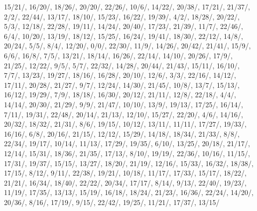 15/21/{}, 16/20/{}, 18/26/{}, 20/20/{}, 22/26/{}, 10/6/{}, 14/22/{}, 20/38/{}, 17/21/{}, 21/37/{}, 2/2/{}, 22/44/{}, 13/17/{}, 18/10/{}, 15/23/{}, 16/22/{}, 19/39/{}, 4/2/{}, 18/28/{}, 20/22/{}, 5/3/{}, 12/18/{}, 22/28/{}, 19/11/{}, 14/24/{}, 20/40/{}, 17/23/{}, 21/39/{}, 11/7/{}, 22/46/{}, 6/4/{}, 10/20/{}, 13/19/{}, 18/12/{}, 15/25/{}, 16/24/{}, 19/41/{}, 18/30/{}, 22/12/{}, 14/8/{}, 20/24/{}, 5/5/{}, 8/4/{}, 12/20/{}, 0/0/{}, 22/30/{}, 11/9/{}, 14/26/{}, 20/42/{}, 21/41/{}, 15/9/{}, 6/6/{}, 16/8/{}, 7/5/{}, 13/21/{}, 18/14/{}, 16/26/{}, 22/14/{}, 14/10/{}, 20/26/{}, 17/9/{}, 21/25/{}, 12/22/{}, 9/5/{}, 5/7/{}, 22/32/{}, 14/28/{}, 20/44/{}, 21/43/{}, 15/11/{}, 16/10/{}, 7/7/{}, 13/23/{}, 19/27/{}, 18/16/{}, 16/28/{}, 20/10/{}, 12/6/{}, 3/3/{}, 22/16/{}, 14/12/{}, 17/11/{}, 20/28/{}, 21/27/{}, 9/7/{}, 12/24/{}, 14/30/{}, 21/45/{}, 10/8/{}, 13/7/{}, 15/13/{}, 16/12/{}, 19/29/{}, 7/9/{}, 18/18/{}, 16/30/{}, 20/12/{}, 21/11/{}, 12/8/{}, 22/18/{}, 4/4/{}, 14/14/{}, 20/30/{}, 21/29/{}, 9/9/{}, 21/47/{}, 10/10/{}, 13/9/{}, 19/13/{}, 17/25/{}, 16/14/{}, 7/11/{}, 19/31/{}, 22/48/{}, 20/14/{}, 21/13/{}, 12/10/{}, 15/27/{}, 22/20/{}, 4/6/{}, 14/16/{}, 20/32/{}, 18/32/{}, 21/31/{}, 8/6/{}, 19/15/{}, 10/12/{}, 13/11/{}, 11/11/{}, 17/27/{}, 19/33/{}, 16/16/{}, 6/8/{}, 20/16/{}, 21/15/{}, 12/12/{}, 15/29/{}, 14/18/{}, 18/34/{}, 21/33/{}, 8/8/{}, 22/34/{}, 19/17/{}, 10/14/{}, 11/13/{}, 17/29/{}, 19/35/{}, 6/10/{}, 13/25/{}, 20/18/{}, 21/17/{}, 12/14/{}, 15/31/{}, 18/36/{}, 21/35/{}, 17/13/{}, 8/10/{}, 19/19/{}, 22/36/{}, 10/16/{}, 11/15/{}, 17/31/{}, 19/37/{}, 15/15/{}, 13/27/{}, 18/20/{}, 21/19/{}, 12/16/{}, 15/33/{}, 16/32/{}, 18/38/{}, 17/15/{}, 8/12/{}, 9/11/{}, 22/38/{}, 19/21/{}, 10/18/{}, 11/17/{}, 17/33/{}, 15/17/{}, 18/22/{}, 21/21/{}, 16/34/{}, 18/40/{}, 22/22/{}, 20/34/{}, 17/17/{}, 8/14/{}, 9/13/{}, 22/40/{}, 19/23/{}, 11/19/{}, 17/35/{}, 13/13/{}, 15/19/{}, 16/18/{}, 18/24/{}, 21/23/{}, 16/36/{}, 22/24/{}, 14/20/{}, 20/36/{}, 8/16/{}, 17/19/{}, 9/15/{}, 22/42/{}, 19/25/{}, 11/21/{}, 17/37/{}, 13/15/{}